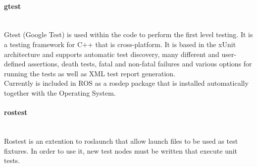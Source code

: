 		\paragraph{gtest}\mbox{} \\

		\label{gtest}
		Gtest (Google Test) is used within the code to perform the first level testing. It is a testing framework for C++ that is cross-platform. It is based in the xUnit architecture and supports automatic test discovery, many different and user-defined assertions, death tests, fatal and non-fatal failures and various options for running the tests as well as XML test report generation. 
		\\

		Currently is included in ROS as a rosdep package that is installed automatically together with the Operating System. 


		\paragraph{rostest}\mbox{} \\

		\label{rostest}
		Rostest is an extention to roslaunch that allow launch files to be used as test fixtures. 
		In order to use it, new test nodes must be written that execute unit tests. 
